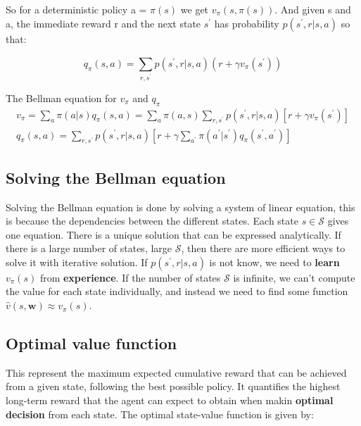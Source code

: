 So for a deterministic policy a = $\pi(s)$ we get $v_\pi(s,\pi(s))$. And given s and a, the immediate reward r and the next state $s^{\prime}$ has probability $p(s^{\prime}, r |s,a)$ so that:

	\begin{equation}
		q_\pi (s,a) = \sum_{r, s^{\prime}}^{} p(s^{\prime},r | s,a) (r + \gamma v_\pi(s^{\prime})) 		
	\end{equation} 


	\begin{wbox}{The Bellman equation for $v_\pi$ and $q_\pi$}
		\begin{equation}
		\begin{aligned}
			v_\pi = \sum_{a}^{} \pi(a |s)q_\pi(s,a) = \sum_{a}^{} \pi(a,s)\sum_{r, s^{\prime}}^{} p(s^{\prime}, r | s, a)[r + \gamma v_\pi(s^{\prime})] \\
			q_\pi(s,a) = \sum_{r, s^{\prime}}^{} p(s^{\prime},r |s,a) [r + \gamma \sum_{a^{\prime}}^{} \pi(a^{\prime} |s^{\prime})q_\pi(s^{\prime},a^{\prime})]
		\end{aligned} 
		\end{equation}
	\end{wbox}

\subsection*{Solving the Bellman equation}
Solving the Bellman equation is done by solving a system of linear equation, this is because the dependencies between the different states. Each state $s \in \mathcal{S}$ gives one equation. There is a unique solution that can be expressed analytically. If there is a large number of states, large $\mathcal{S}$,  then there are more efficient ways to solve it with iterative solution. If $p(s^{\prime}, r |s,a)$ is not know, we need to \textbf{learn} $v_\pi(s)$ from \textbf{experience}. If the number of states $\mathcal{S}$ is infinite, we can't compute the value for each state individually, and instead we need to find some function $\hat{v}(s,\textbf{w}) \approx v_\pi(s)$. 


\subsection*{Optimal value function}
This represent the maximum expected cumulative reward that can be achieved from a given state, following the best possible policy. It quantifies the highest long-term reward that the agent can expect to obtain when makin \textbf{optimal decision} from each state. The optimal state-value function is given by:

